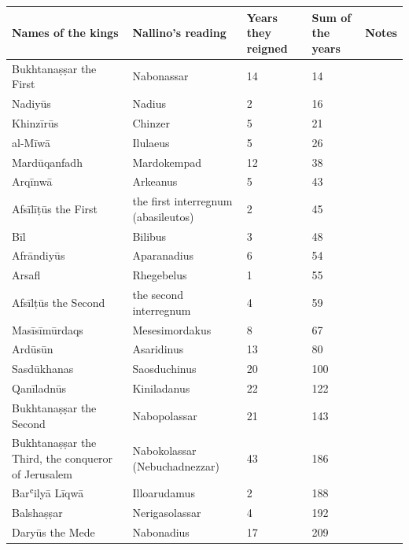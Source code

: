 \par{}\nopagebreak{}
\par{}\nopagebreak
{\small\setlength{\tabcolsep}{3pt}\begin{longtable}{L{38mm}L{38mm}R{13mm}R{13mm}L{32mm}}
\textbf{Names of the kings} & \textbf{Nallino's reading} & \textbf{Years they reigned} & \textbf{Sum of the years} & \textbf{Notes}\\\hline\endhead
Bukhtanaṣṣar the First & Nabonassar & 14 & 14 & \\
Nadiyūs & Nadius & 2 & 16 & \\
Khinzīrūs & Chinzer & 5 & 21 & \\
al-Mīwā & Ilulaeus & 5 & 26 & \\
Mardūqanfadh & Mardokempad & 12 & 38 & \\
Arqīnwā & Arkeanus & 5 & 43 & \\
Afsīlīṭūs the First & the first interregnum (abasileutos) & 2 & 45 & \\
Bīl & Bilibus & 3 & 48 & \\
Afrāndiyūs & Aparanadius & 6 & 54 & \\
Arsafl & Rhegebelus & 1 & 55 & \\
Afsīlṭūs the Second & the second interregnum & 4 & 59 & \\
Masīsīmūrdaqs & Mesesimordakus & 8 & 67 & \\
Ardūsūn & Asaridinus & 13 & 80 & \\
Sasdūkhanas & Saosduchinus & 20 & 100 & \\
Qanīladnūs & Kiniladanus & 22 & 122 & \\
Bukhtanaṣṣar the Second & Nabopolassar & 21 & 143 & \\
Bukhtanaṣṣar the Third, the conqueror of Jerusalem & Nabokolassar (Nebuchadnezzar) & 43 & 186 & \\
Barʿilyā Līqwā & Illoarudamus & 2 & 188 & \\
Balshaṣṣar & Nerigasolassar & 4 & 192 & \\
Daryūs the Mede & Nabonadius & 17 & 209 & \\

\end{longtable}}
